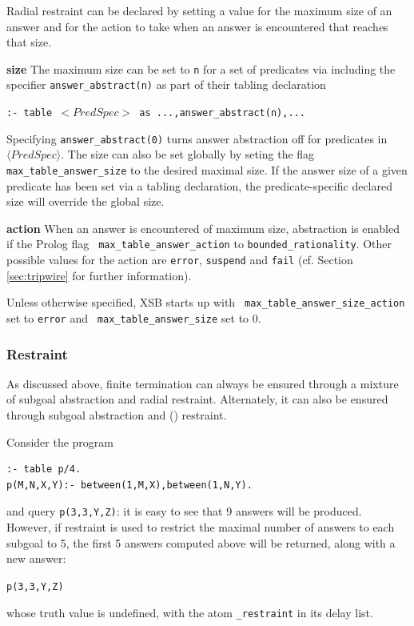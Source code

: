 Radial restraint can be declared by setting a value for the maximum
size of an answer and for the action to take when an answer is
encountered that reaches that size.
%
\bi
\item {\bf size} The maximum size can be set to {\tt n} for a set of
  predicates via including the specifier {\tt answer\_abstract(n)} as
  part of their tabling declaration

{\tt :- table $<PredSpec>$ as ...,answer\_abstract(n),...}

  Specifying {\tt answer\_abstract(0)} turns answer abstraction off
  for predicates in $\langle PredSpec \rangle$.  The size can also be
  set globally by seting the flag {\tt max\_table\_answer\_size} to
  the desired maximal size.  If the answer size of a given predicate
  has been set via a tabling declaration, the predicate-specific
  declared size will override the global size.

\item {\bf action} When an answer is encountered of maximum size,
  abstraction is enabled if the Prolog flag {\tt
    max\_table\_answer\_action} to {\tt bounded\_rationality}.  Other
  possible values for the action are {\tt error}, {\tt suspend}  and {\tt fail}
  (cf. Section \ref{sec:tripwire} for further information).  \ei


%
Unless otherwise specified, XSB starts up with {\tt
  max\_table\_answer\_size\_action} set to {\tt error} and {\tt
  max\_table\_answer\_size} set to 0.  
%

\subsubsection{\MAXANS Restraint} \label{sec:answer-count-restraint}

As discussed above, finite termination can always be ensured through a
mixture of subgoal abstraction and radial restraint.  Alternately, it
can also be ensured through subgoal abstraction and \maxans()
restraint.  

\begin{example} \label{ex:maxans}
Consider the program

\begin{verbatim}
:- table p/4.
p(M,N,X,Y):- between(1,M,X),between(1,N,Y).
\end{verbatim}

\noindent
and query {\tt p(3,3,Y,Z)}: it is easy to see that 9 answers will be
produced.  However, if \maxans{} restraint is used to restrict the
maximal number of answers to each subgoal to 5, the first 5 answers
computed above will be returned, along with a new answer:

{\tt p(3,3,Y,Z)}

\noindent
whose truth value is undefined, with the atom 
%
{\tt \maxUans\_restraint} in its delay list.
\end{example}

